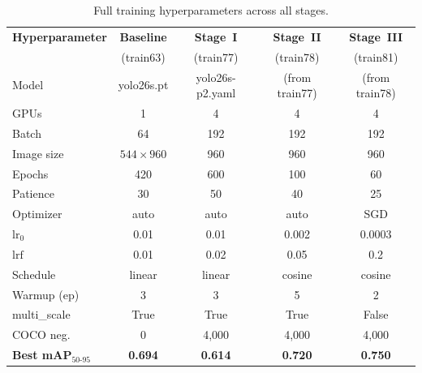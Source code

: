 \documentclass[12pt, titlepage]{article}
\begin{document}
\begin{table}[H]
  \centering
  \caption{Full training hyperparameters across all stages.}
  \label{tab:full_hyper}
  \small
  \begin{tabular}{@{}lcccc@{}}
    \toprule
    \textbf{Hyperparameter}            & \textbf{Baseline} & \textbf{Stage~I} & \textbf{Stage~II} & \textbf{Stage~III} \\
                                       & (train63)         & (train77)        & (train78)         & (train81)          \\
    \midrule
    Model                              & yolo26s.pt        & yolo26s-p2.yaml  & (from train77)    & (from train78)     \\
    GPUs                               & 1                 & 4                & 4                 & 4                  \\
    Batch                              & 64                & 192              & 192               & 192                \\
    Image size                         & $544{\times}960$  & 960              & 960               & 960                \\
    Epochs                             & 420               & 600              & 100               & 60                 \\
    Patience                           & 30                & 50               & 40                & 25                 \\
    Optimizer                          & auto              & auto             & auto              & SGD                \\
    $\text{lr}_0$                      & 0.01              & 0.01             & 0.002             & 0.0003             \\
    $\text{lrf}$                       & 0.01              & 0.02             & 0.05              & 0.2                \\
    Schedule                           & linear            & linear           & cosine            & cosine             \\
    Warmup (ep)                        & 3                 & 3                & 5                 & 2                  \\
    multi\_scale                       & True              & True             & True              & False              \\
    COCO neg.                          & 0                 & 4{,}000          & 4{,}000           & 4{,}000            \\
    \midrule
    \textbf{Best mAP$_{50\text{-}95}$} & \textbf{0.694}    & \textbf{0.614}   & \textbf{0.720}    & \textbf{0.750}     \\
    \bottomrule
  \end{tabular}
\end{table}
\end{document}

